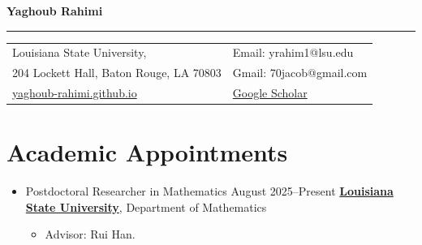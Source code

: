 \documentclass[11pt]{article}
\date{October 1, 2026}
\makeatletter
\newcommand{\makeheading}[1]
        {\hspace*{-\marginparsep minus \marginparwidth}
         \begin{minipage}[t]{\textwidth+\marginparwidth+\marginparsep}
                {\large \bfseries #1 \hfill \small  {\@date}}\\[-0.15\baselineskip]
                 \rule{\columnwidth}{1pt}
         \end{minipage}}
\makeatother
\begin{document}

\makeheading{\Large Yaghoub Rahimi }

\vspace{2 mm}

\begin{tabular}{l l}
Louisiana State University, & \hspace{0.5in}  Email: yrahim1@lsu.edu
\\
204 Lockett Hall, Baton Rouge, LA 70803 & \hspace{0.5in} Gmail: 70jacob@gmail.com
\\
\href{https://yaghoub-rahimi.github.io/}{yaghoub-rahimi.github.io} & \hspace{0.5in}  \href{https://scholar.google.com/citations?user=u2n-iosAAAAJ&hl=en}{Google Scholar}
\end{tabular}




\section{Academic Appointments}

\begin{itemize}
    \item Postdoctoral Researcher in Mathematics \hfill August 2025--Present
\newline
\href{https://www.lsu.edu/}{\textbf{Louisiana State University}}, Department of Mathematics
\begin{itemize}
    \item Advisor: Rui Han.
\end{itemize}

\end{itemize}
\end{document}
